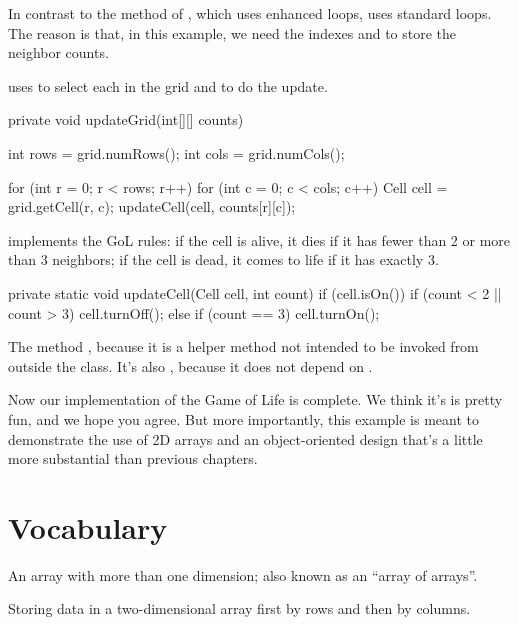In contrast to the  method of , which uses enhanced  loops,  uses standard  loops.
The reason is that, in this example, we need the indexes  and  to store the neighbor counts.

 uses  to select each  in the grid and  to do the update.

\begin{code}
private void updateGrid(int[][] counts) {
    int rows = grid.numRows();
    int cols = grid.numCols();

    for (int r = 0; r < rows; r++) {
        for (int c = 0; c < cols; c++) {
            Cell cell = grid.getCell(r, c);
            updateCell(cell, counts[r][c]);
        }
    }
}
\end{code}

 implements the GoL rules: if the cell is alive, it dies if it has fewer than 2 or more than 3 neighbors; if the cell is dead, it comes to life if it has exactly 3.

\begin{code}
private static void updateCell(Cell cell, int count) {
    if (cell.isOn()) {
        if (count < 2 || count > 3) {
            cell.turnOff();
        }
    } else {
        if (count == 3) {
            cell.turnOn();
        }
    }
}
\end{code}

The  method , because it is a helper method not intended to be invoked from outside the class.
It's also , because it does not depend on .

Now our implementation of the Game of Life is complete.
We think it's is pretty fun, and we hope you agree.
But more importantly, this example is meant to demonstrate the use of 2D arrays and an object-oriented design that's a little more substantial than previous chapters.



\section{Vocabulary}

\begin{description}

An array with more than one dimension; also known as an ``array of arrays''.

Storing data in a two-dimensional array first by rows and then by columns.

\end{description}


